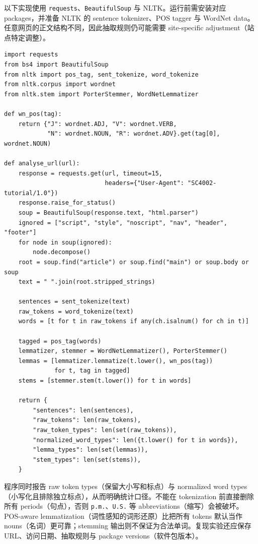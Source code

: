 \begin{checkedsolution}
以下实现使用 \texttt{requests}、\texttt{BeautifulSoup} 与 NLTK。运行前需安装对应 packages，并准备 NLTK 的 sentence tokenizer、POS tagger 与 WordNet data。任意网页的正文结构不同，因此抽取规则仍可能需要 site-specific adjustment（站点特定调整）。

{\footnotesize
\begin{verbatim}
import requests
from bs4 import BeautifulSoup
from nltk import pos_tag, sent_tokenize, word_tokenize
from nltk.corpus import wordnet
from nltk.stem import PorterStemmer, WordNetLemmatizer

def wn_pos(tag):
    return {"J": wordnet.ADJ, "V": wordnet.VERB,
            "N": wordnet.NOUN, "R": wordnet.ADV}.get(tag[0], wordnet.NOUN)

def analyse_url(url):
    response = requests.get(url, timeout=15,
                            headers={"User-Agent": "SC4002-tutorial/1.0"})
    response.raise_for_status()
    soup = BeautifulSoup(response.text, "html.parser")
    ignored = ["script", "style", "noscript", "nav", "header", "footer"]
    for node in soup(ignored):
        node.decompose()
    root = soup.find("article") or soup.find("main") or soup.body or soup
    text = " ".join(root.stripped_strings)

    sentences = sent_tokenize(text)
    raw_tokens = word_tokenize(text)
    words = [t for t in raw_tokens if any(ch.isalnum() for ch in t)]

    tagged = pos_tag(words)
    lemmatizer, stemmer = WordNetLemmatizer(), PorterStemmer()
    lemmas = [lemmatizer.lemmatize(t.lower(), wn_pos(tag))
              for t, tag in tagged]
    stems = [stemmer.stem(t.lower()) for t in words]

    return {
        "sentences": len(sentences),
        "raw_tokens": len(raw_tokens),
        "raw_token_types": len(set(raw_tokens)),
        "normalized_word_types": len({t.lower() for t in words}),
        "lemma_types": len(set(lemmas)),
        "stem_types": len(set(stems)),
    }
\end{verbatim}
}

程序同时报告 raw token types（保留大小写和标点）与 normalized word types（小写化且排除独立标点），从而明确统计口径。不能在 tokenization 前直接删除所有 periods（句点），否则 \texttt{p.m.}、\texttt{U.S.} 等 abbreviations（缩写）会被破坏。POS-aware lemmatization（词性感知的词形还原）比把所有 tokens 默认当作 nouns（名词）更可靠；stemming 输出则不保证为合法单词。复现实验还应保存 URL、访问日期、抽取规则与 package versions（软件包版本）。
\end{checkedsolution}

